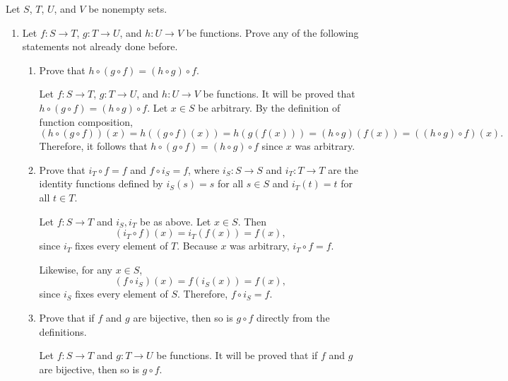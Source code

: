 \newpage
Let \(S\), \(T\), \(U\), and \(V\) be nonempty sets. 
\begin{enumerate}
  \item Let \(f: S \to T\), \(g: T \to U\), and \(h: U \to V\) be functions.
  Prove any of the following statements not already done before.
  \begin{enumerate}
    \item Prove that \(h \circ (g \circ f) = (h \circ g) \circ f\).
    \begin{subprove}
      Let \(f: S \to T\), \(g: T \to U\), and \(h: U \to V\) be functions.
      It will be proved that \(h \circ (g \circ f) = (h \circ g) \circ f\).\proofstep
      Let \(x \in S\) be arbitrary.
      By the definition of function composition, 
      \[
      (h\circ(g\circ f))(x)= h((g \circ f)(x))=h(g(f(x)))= (h \circ g)(f(x))=((h\circ g)\circ f)(x).
      \]
      Therefore, it follows that \(h \circ (g \circ f) = (h \circ g) \circ f\)
      since \(x\) was arbitrary.
    \end{subprove}
    \item Prove that \(i_{T} \circ f = f\) and \(f \circ i_{S} = f\), where \(i_{S}: S \to S\) and \(i_{T}: T \to T\) are the identity functions defined by \(i_{S}(s) = s\) for all \(s \in S\) and \(i_{T}(t) = t\) for all \(t \in T\).
    \begin{subprove}
      Let \(f: S \to T\) and \(i_S,i_T\) be as above.
      Let \(x \in S\). Then
      \[
        (i_{T}\circ f)(x)=i_{T}(f(x))=f(x),
      \]
      since \(i_{T}\) fixes every element of \(T\). Because \(x\) was arbitrary, \(i_{T}\circ f=f\).

      Likewise, for any \(x \in S\),
      \[
        (f\circ i_{S})(x)=f(i_{S}(x))=f(x),
      \]
      since \(i_{S}\) fixes every element of \(S\). Therefore, \(f\circ i_{S}=f\).
    \end{subprove}
    \item Prove that if \(f\) and \(g\) are bijective, then so is \(g \circ f\) directly from the definitions.
    \begin{subprove}
      Let \(f: S \to T\) and \(g: T \to U\) be functions.
      It will be proved that if \(f\) and \(g\) are bijective, then so is \(g \circ f\).
      

\end{subprove}
\end{enumerate}
\end{enumerate}
